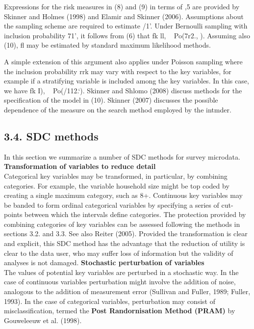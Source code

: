 

Expressions for the risk measures in (8) and (9) in terms of ,5 are provided by Skinner
and Holmes (1998) and Elamir and Skinner (2006). Assumptions about the sampling
scheme are required to estimate /1’. Under Bernoulli sampling with inclusion probability
71', it follows from (6) that fk ll, ~ Po(7r2., ). Assuming also (10), ﬂ may be estimated
by standard maximum likelihood methods. 

A simple extension of this argument also
applies under Poisson sampling where the inclusion probability rrk may vary with respect
to the key variables, for example if a stratifying variable is included among the key
variables. In this case, we have fk I), ~ Po(/112.‘). Skinner and Shlomo (2008) discuss
methods for the specification of the model in (10). Skinner (2007) discusses the possible
dependence of the measure on the search method employed by the intmder.
\subsection*{3.4. SDC methods}
In this section we summarize a number of SDC methods for survey microdata.
\noindent \textbf{Transformation of variables to reduce detail}\\ Categorical key variables may be
transformed, in particular, by combining categories. For example, the variable household
size might be top coded by creating a single maximum category, such as 8+. Continuous
key variables may be banded to form ordinal categorical variables by specifying a series
of cut-points between which the intervals define categories. 
The protection provided by combining categories of key variables can be assessed following the methods in sections
3.2. and 3.3. See also Reiter (2005). Provided the transformation is clear and explicit,
this SDC method has the advantage that the reduction of utility is clear to the data user,
who may suffer loss of information but the validity of analyses is not damaged.
\noindent \textbf{Stochastic perturbation of variables}\\ The values of potential key variables are
perturbed in a stochastic way. In the case of continuous variables perturbation might
involve the addition of noise, analogous to the addition of measurement error (Sullivan and Fuller, 1989; Fuller, 1993). In the case of categorical variables, perturbation may consist of misclassification, termed the \textbf{Post Randornisation Method (PRAM)} by
Gouweleeuw et al. (1998). 

